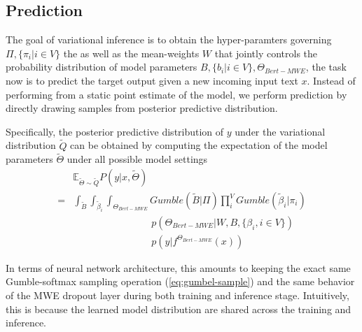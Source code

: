 \subsection{Prediction} \label{sec:prediction}
The goal of variational inference is to obtain the hyper-paramters governing $\Pi, \{\pi_i \vert i \in V\}$ the as well as the mean-weights $W$ that jointly controls the probability distribution of model parameters $B, \{b_i \vert i \in V\}, \Theta_{Bert-MWE}$, the task now is to predict the target output given a new incoming input text $x$.
Instead of performing  from a static point estimate of the model, we perform prediction by directly drawing samples from posterior predictive distribution.

Specifically, the posterior predictive distribution of $y$ under the variational distribution $\tilde{Q}$ can be obtained by computing the expectation of the model parameters $\tilde{\Theta}$ under all possible model settings
\begin{align}
& \mathbb{E}_{\tilde{\Theta} \sim \tilde{Q}} P (y | x, \tilde{\Theta}) \nonumber\\ 
= & \int_{\tilde{B}} \int_{\tilde{\beta}_i}\int_{\Theta_{Bert-MWE}} Gumble(\tilde{B} | \Pi) \prod_i^{V} Gumble(\tilde{\beta}_i | \pi_i) \nonumber\\ 
& \quad \quad \quad \quad \quad \quad \quad \quad p(\Theta_{Bert-MWE} \vert W, B, \{\beta_i, i \in V\}) \nonumber\\ 
& \quad \quad \quad \quad \quad \quad \quad \quad p(y \vert f^{\Theta_{Bert-MWE}}(x)) 
\label{eq:exp-gumble}
\end{align}

In terms of neural network architecture, this amounts to keeping the exact same Gumble-softmax sampling operation (\autoref{eq:gumbel-sample}) and the same behavior of the MWE dropout layer during both training and inference stage. Intuitively, this is because the learned model distribution are shared across the training and inference.
